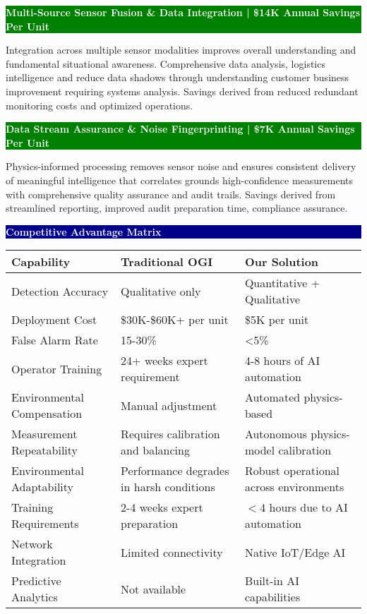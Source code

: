 \documentclass[11pt,a4paper]{article}
\begin{document}
\begin{minipage}{0.48\textwidth}
\vspace{0.2cm}

\colorbox{green}{\parbox{\linewidth}{\textcolor{white}{\textbf{Multi-Source Sensor Fusion \& Data Integration | \$14K Annual Savings Per Unit}}}}
\small Integration across multiple sensor modalities improves overall understanding and fundamental situational awareness. Comprehensive data analysis, logistics intelligence and reduce data shadows through understanding customer business improvement requiring systems analysis. Savings derived from reduced redundant monitoring costs and optimized operations.

\vspace{0.2cm}

\colorbox{green}{\parbox{\linewidth}{\textcolor{white}{\textbf{Data Stream Assurance \& Noise Fingerprinting | \$7K Annual Savings Per Unit}}}}
\small Physics-informed processing removes sensor noise and ensures consistent delivery of meaningful intelligence that correlates grounds high-confidence measurements with comprehensive quality assurance and audit trails. Savings derived from streamlined reporting, improved audit preparation time, compliance assurance.

\vspace{0.3cm}

\colorbox{darkblue}{\parbox{\linewidth}{\centering\textcolor{white}{\textbf{Competitive Advantage Matrix}}}}

\begin{tabular}{|l|l|l|}
\hline
\textbf{Capability} & \textbf{Traditional OGI} & \textbf{Our Solution} \\
\hline
Detection Accuracy & Qualitative only & Quantitative + Qualitative \\
\hline
Deployment Cost & \$30K-\$60K+ per unit & \$5K per unit \\
\hline
False Alarm Rate & 15-30\% & <5\% \\
\hline
Operator Training & 24+ weeks expert requirement & 4-8 hours of AI automation \\
\hline
Environmental Compensation & Manual adjustment & Automated physics-based \\
\hline
Measurement Repeatability & Requires calibration and balancing & Autonomous physics-model calibration \\
\hline
Environmental Adaptability & Performance degrades in harsh conditions & Robust operational across environments \\
\hline
Training Requirements & 2-4 weeks expert preparation & $<$4 hours due to AI automation \\
\hline
Network Integration & Limited connectivity & Native IoT/Edge AI \\
\hline
Predictive Analytics & Not available & Built-in AI capabilities \\
\hline
\end{tabular}

\end{minipage}
\end{document}
